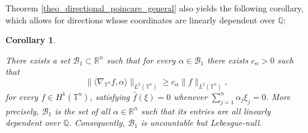 \documentclass[11pt]{amsart}
\numberwithin{theorem}{section}
\numberwithin{equation}{section}
\newtheorem{corollary}[theorem]{Corollary}
\theoremstyle{definition}
\numberwithin{example}{section}
\theoremstyle{definition}
\theoremstyle{definition}
\newcommand{\R}{\mathbb{R}}
\newcommand{\T}{\mathbb{T}}
\begin{document}
Theorem \eqref{theo_directional_poincare_general} also yields the following corollary, which allows for directions whose coordinates are linearly dependent over $\mathbb{Q}$:
\begin{corollary}\label{coro_rational}
     
     There exists a set $\mathcal{B}_1\subset \R^n$ such that for every  $\alpha\in\mathcal{B}_1$ there exists $c_\alpha>0$ such that
\begin{equation}\label{ineq_rational}
        \| \langle \nabla_{\T^n} f,\alpha\rangle \|_{L^2(\T^n)}\geq c_\alpha\|f\|_{L^2(\T^n)},
    \end{equation}
    for every $f\in H^1(\T^n)$, satisfying $\widehat{f}(\xi)=0$ whenever $\sum_{j=1}^n \alpha_j\xi_j=0$. More precisely, $\mathcal{B}_1$ is the set of all $\alpha\in \R^n$ such that its entries are all linearly dependent over $\mathbb{Q}$. Consequently, $\mathcal{B}_1$ is uncountable but Lebesgue-null. 
\end{corollary}
\end{document}
